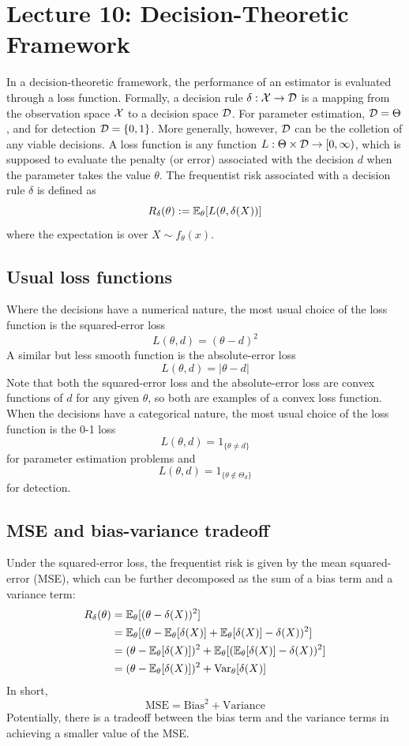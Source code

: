 \documentclass[11pt]{book}
\begin{document}
\section{Lecture 10: Decision-Theoretic Framework}
In a decision-theoretic framework, the performance of an estimator is evaluated through a loss function.
Formally, a decision rule $\delta : \mathcal{X} \to \mathcal{D}$ is a mapping from the observation space $\mathcal{X}$ to a decision space $\mathcal{D}$. For parameter estimation, $\mathcal{D} = \Theta$, and for detection $\mathcal{D} = \{0, 1\}$. More 
generally, however, $\mathcal{D}$ can be the colletion of any viable decisions. A loss function is any function $L: \Theta \times \mathcal{D} \to [0, \infty)$, which is supposed to evaluate the penalty (or error) associated with the 
decision $d$ when the parameter takes the value $\theta$. The frequentist risk associated with a decision rule 
$\delta$ is defined as 
\[ 
  R_\delta(\theta) := \mathbb{E}_\theta[L(\theta, \delta(X))]
\]
where the expectation is over $X \sim f_\theta(x)$.
\subsection{Usual loss functions}
Where the decisions have a numerical nature, the most usual choice of the loss function is the squared-error loss 
\[
  L(\theta, d) = (\theta - d)^2 
\]
A similar but less smooth function is the absolute-error loss 
\[
  L(\theta, d) = |\theta - d|
\]
Note that both the squared-error loss and the absolute-error loss are convex functions of $d$ for any given $\theta$, so both are examples of a 
convex loss function. When the decisions have a categorical nature, the most usual choice of the loss function is the 0-1 loss 
\[
  L(\theta, d) = 1_{\{\theta \neq d\}}
\]
for parameter estimation problems and 
\[
  L(\theta, d) = 1_{\{\theta \notin \Theta_d\}}
\]
for detection.
\subsection{MSE and bias-variance tradeoff}
Under the squared-error loss, the frequentist risk is given by the mean squared-error (MSE), which can be further decomposed as the 
sum of a bias term and a variance term: 
\begin{align*}
  R_\delta(\theta) &= \mathbb{E}_\theta[(\theta - \delta(X))^2] \\ 
                   &= \mathbb{E}_\theta[(\theta - \mathbb{E}_\theta[\delta(X)] + \mathbb{E}_\theta[\delta(X)] - \delta(X))^2] \\ 
                   &= (\theta - \mathbb{E}_\theta[\delta(X)])^2 + \mathbb{E}_\theta[(\mathbb{E}_\theta[\delta(X)] - \delta(X))^2] \\ 
                   &= (\theta - \mathbb{E}_\theta[\delta(X)])^2 + \operatorname{Var}_\theta[\delta(X)]
\end{align*}
In short, 
\[
  \text{MSE} = \text{Bias}^2 + \text{Variance}
\]
Potentially, there is a tradeoff between the bias term and the variance terms in achieving a smaller value of the MSE.
\end{document}
